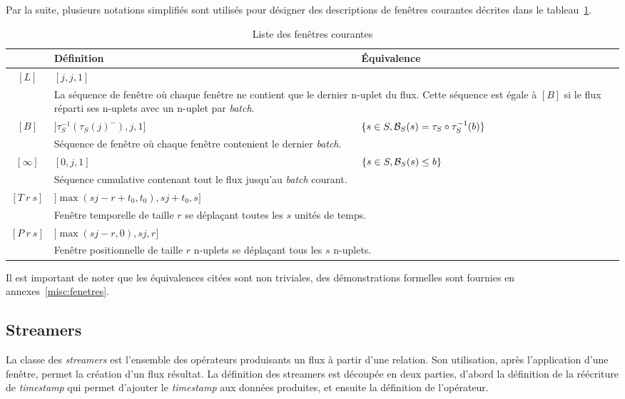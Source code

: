 Par la suite, plusieurs notations simplifiés sont utilisés pour désigner des descriptions de fenêtres courantes décrites dans le tableau~\ref{tab:windows}.
\begin{table}[ht]
\centering
\begin{tabular}{c||p{}|p{}}
  & Définition & Équivalence \\ \bottomrule
 $[L]$ & $[j,j,1]$ &  \\ 
 & \multicolumn{2}{p{0.8\textwidth}}{La séquence de fenêtre où chaque fenêtre ne contient que le dernier n-uplet du flux. Cette séquence est égale à $[B]$ si le flux réparti ses n-uplets avec un n-uplet par \textit{batch}.} \\ \hline
 $[B]$ & $]\tau_S^{-1}(\tau_S(j)^-),j,1]$ & $\{s\in S, \mathcal{B}_S(s) = \tau_S\circ\tau_S^{-1}(b)\}$ \\ 
 & \multicolumn{2}{p{0.8\textwidth}}{Séquence de fenêtre où chaque fenêtre contenient le dernier \textit{batch}.} \\\hline
 $[\infty]$ & $[0,j,1]$ & $\{s\in S, \mathcal{B}_S(s) \leq b\}$ \\
 & \multicolumn{2}{p{0.8\textwidth}}{Séquence cumulative contenant tout le flux jusqu'au \textit{batch} courant.} \\\hline
 $[T\ r\ s]$ & $]\max(sj-r+t_0,t_0),sj+t_0,s]$ &  \\
 & \multicolumn{2}{p{0.8\textwidth}}{Fenêtre temporelle de taille $r$ se déplaçant toutes les $s$ unités de temps.} \\\hline
 $[P\ r\ s]$ & $]\max(sj-r,0),sj,r]$ &  \\
 & \multicolumn{2}{p{0.8\textwidth}}{Fenêtre positionnelle de taille $r$ n-uplets se déplaçant tous les $s$ n-uplets.} \\
 \toprule
\end{tabular}
\caption{Liste des fenêtres courantes} \label{tab:windows}
\end{table}
Il est important de noter que les équivalences citées sont non triviales, des démonstrations formelles sont fournies en annexes~\ref{misc:fenetres}.

\subsection{Streamers}
La classe des \textit{streamers} est l'ensemble des opérateurs produisants un flux à partir d'une relation. Son utilisation, après l'application d'une fenêtre, permet la création d'un flux résultat. La définition des streamers est découpée en deux parties, d'abord la définition de la réécriture de \textit{timestamp} qui permet d'ajouter le \textit{timestamp} aux données produites, et ensuite la définition de l'opérateur.
